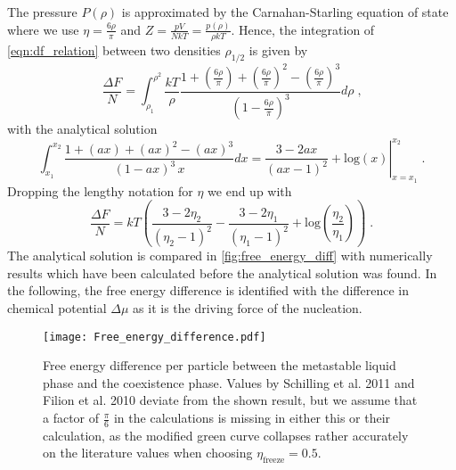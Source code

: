The pressure $P(\rho)$ is approximated by the Carnahan-Starling equation of state where we use $\eta = \frac{6 \rho }{\pi}$ and $Z=\frac{pV}{NkT} = \frac{p(\rho)}{\rho kT}$. Hence, the integration of \autoref{eqn:df_relation} between two densities $\rho_{1/2}$ is given by
\begin{equation}
\frac{\Delta F}{N} = \int_{\rho_1}^{\rho^2} \frac{kT}{\rho} \frac{1+\left( \frac{6 \rho}{\pi}\right) +\left( \frac{6 \rho}{\pi}\right)^2 - \left( \frac{6 \rho}{\pi}\right)^3}{\left( 1 - \frac{6 \rho}{\pi}\right)^3} d\rho \; \text{,}
\end{equation}
with the analytical solution
\begin{equation}
\int_{x_1}^{x_2} \frac{1+(ax) +(ax)^2 - (ax)^3 }{( 1 - ax )^3 \,  x} dx = \left. \frac{3-2ax}{(ax-1)^2} + \text{log}(x) \right|_{x=x_1}^{x_2} \; \text{.}
\end{equation}
Dropping the lengthy notation for $\eta$ we end up with
\begin{equation}
\frac{\Delta F}{N} = kT \left(  \frac{3-2 \eta_2}{(\eta_2 - 1)^2} - \frac{3-2 \eta_1}{(\eta_1 - 1)^2} + \text{log}\left( \frac{\eta_2}{\eta_1} \right) \right) \; \text{.}
\end{equation}
The analytical solution is compared in \autoref{fig:free_energy_diff} with numerically results which have been calculated before the analytical solution was found. In the following, the free energy difference is identified with the difference in chemical potential $\Delta \mu$ as it is the driving force of the nucleation.\\

\begin{figure}[h]
\centering
\texttt{[image: Free\_energy\_difference.pdf]}
\caption[Free energy difference between fluid and solid phase]{Free energy difference per particle between the metastable liquid phase and the coexistence phase. Values by Schilling et al. 2011\cite{Schilling2011} and Filion et al. 2010\cite{Filion2010a} deviate from the shown result, but we assume that a factor of $\frac{\pi}{6}$ in the calculations is missing in either this or their calculation, as the modified green curve collapses rather accurately on the literature values when choosing $\eta_{\text{freeze}}=0.5$.}
\label{fig:free_energy_diff}
\end{figure}

